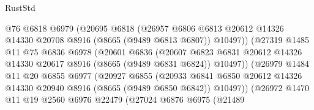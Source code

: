 \begin{lexlean}{RustStd}
\begin{coremodule}
                              @76
                              @6818
                              @6979
                              (@20695
                                @6818
                                (@26957
                                  @6806
                                  @6813
                                  @20612
                                  @14326
                                  @14330
                                  @20708
                                  @8916
                                  (@8665 (@9489 @6813 @6807))
                                  @10497))
                              (@27319
                                @1485
                                @11
                                @75
                                @6836
                                @6978
                                (@20601
                                  @6836
                                  (@20607
                                    @6823
                                    @6831
                                    @20612
                                    @14326
                                    @14330
                                    @20617
                                    @8916
                                    (@8665 (@9489 @6831 @6824))
                                    @10497))
                                (@26979
                                  @1484
                                  @11
                                  @20
                                  @6855
                                  @6977
                                  (@20927
                                    @6855
                                    (@20933
                                      @6841
                                      @6850
                                      @20612
                                      @14326
                                      @14330
                                      @20940
                                      @8916
                                      (@8665 (@9489 @6850 @6842))
                                      @10497))
                                  (@26972
                                    @1470
                                    @11
                                    @19
                                    @2560
                                    @6976
                                    @22479
                                    (@27024
                                      @6876
                                      @6975
                                      (@21489

\end{coremodule}
\end{lexlean}
